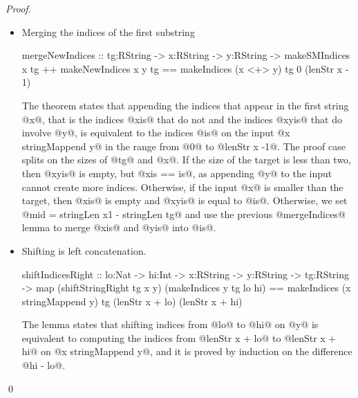 \begin{proof}
\begin{itemize}
\item Merging the indices of the first substring
\begin{code}
mergeNewIndices 
  :: tg:RString -> x:RString -> y:RString
  -> { makeSMIndices x tg 
    ++ makeNewIndices x y tg
    == makeIndices (x <+> y) tg 0 (lenStr x - 1)} 
\end{code}
The theorem states that appending the indices that appear in the first string @x@, 
that is the indices @xis@ that do not and the indices @xyis@ that do involve @y@, 
is equivalent to the indices @is@ on the input @x stringMappend y@
in the range from @0@ to @lenStr x -1@. 
%
The proof case splits on the sizes of @tg@ and @x@. 
%
If the size of the target is less than two, then @xyis@ is empty, 
but @xis == is@, as appending @y@ to the input cannot create more indices. 
%
Otherwise, if the input @x@ is smaller than the target, 
then @xis@ is empty and @xyis@ is equal to @is@. 
%
Otherwise, we set @mid = stringLen x1 - stringLen tg@ 
and use the previous @mergeIndices@ lemma to merge @xis@ and @yis@ into @is@.
\item Shifting is left concatenation.
\begin{code}
shiftIndicesRight
  :: lo:Nat -> hi:Int  
  -> x:RString -> y:RString 
  -> tg:RString
  -> { map (shiftStringRight tg x y) 
           (makeIndices y tg lo hi) 
  == makeIndices (x stringMappend y) tg 
                 (lenStr x + lo) (lenStr x + hi) }

\end{code}
The lemma states that shifting indices from @lo@ to @hi@ on @y@
is equivalent to computing the indices from @lenStr x + lo@
to @lenStr x + hi@ on @x stringMappend y@, 
and it is proved by induction on the difference @hi - lo@.
\end{itemize}
\qed\end{proof}


